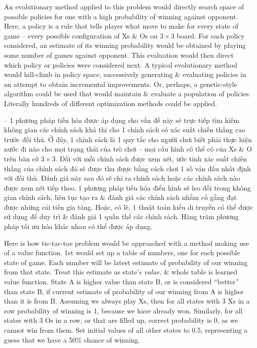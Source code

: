 \documentclass{article}
\begin{document}
\begin{itemize}
\begin{itemize}
        An evolutionary method applied to this problem would directly search space of possible policies for one with a high probability of winning against opponent. Here, a policy is a rule that tells player what move to make for every state of game -- every possible configuration of Xs \& Os on $3\times3$ board. For each policy considered, an estimate of its winning probability would be obtained by playing some number of games against opponent. This evaluation would then direct which policy or policies were considered next. A typical evolutionary method would hill-climb in policy space, successively generating \& evaluating policies in an attempt to obtain incremental improvements. Or, perhaps, a genetic-style algorithm could be used that would maintain \& evaluate a population of policies. Literally hundreds of different optimization methods could be applied.

        -- 1 phương pháp tiến hóa được áp dụng cho vấn đề này sẽ trực tiếp tìm kiếm không gian các chính sách khả thi cho 1 chính sách có xác suất chiến thắng cao trước đối thủ. Ở đây, 1 chính sách là 1 quy tắc cho người chơi biết phải thực hiện nước đi nào cho mọi trạng thái của trò chơi -- mọi cấu hình có thể có của Xs \& O trên bàn cờ $3\times3$. Đối với mỗi chính sách được xem xét, ước tính xác suất chiến thắng của chính sách đó sẽ được thu được bằng cách chơi 1 số ván đấu nhất định với đối thủ. Đánh giá này sau đó sẽ chỉ ra chính sách hoặc các chính sách nào được xem xét tiếp theo. 1 phương pháp tiến hóa điển hình sẽ leo đồi trong không gian chính sách, liên tục tạo ra \& đánh giá các chính sách nhằm cố gắng đạt được những cải tiến gia tăng. Hoặc, có lẽ, 1 thuật toán kiểu di truyền có thể được sử dụng để duy trì \& đánh giá 1 quần thể các chính sách. Hàng trăm phương pháp tối ưu hóa khác nhau có thể được áp dụng.

        Here is how tic-tac-toe problem would be approached with a method making use of a value function. 1st would set up a table of numbers, one for each possible state of game. Each number will be latest estimate of probability of our winning from that state. Treat this estimate as state's {\it value}, \& whole table is learned value function. State A is higher value than state B, or is considered ``better'' than state B, if current estimate of probability of our winning from A is higher than it is from B. Assuming we always play Xs, then for all states with 3 Xs in a row probability of winning is 1, because we have already won. Similarly, for all states with 3 Os in a row, or that are filled up, correct probability is 0, as we cannot win from them. Set initial values of all other states to 0.5, representing a guess that we have a 50\% chance of winning.


\end{itemize}
\end{itemize}
\end{document}
